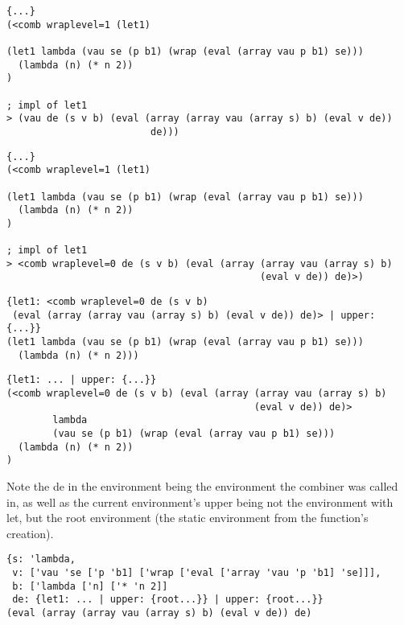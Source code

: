 \documentclass{beamer}
\begin{document}
\begin{frame}[fragile]
\footnotesize
\begin{verbatim}
{...}
(<comb wraplevel=1 (let1)

(let1 lambda (vau se (p b1) (wrap (eval (array vau p b1) se)))
  (lambda (n) (* n 2))
)

; impl of let1
> (vau de (s v b) (eval (array (array vau (array s) b) (eval v de))
                         de)))
\end{verbatim}
\end{frame}

\begin{frame}[fragile]
\footnotesize
\begin{verbatim}
{...}
(<comb wraplevel=1 (let1)

(let1 lambda (vau se (p b1) (wrap (eval (array vau p b1) se)))
  (lambda (n) (* n 2))
)

; impl of let1
> <comb wraplevel=0 de (s v b) (eval (array (array vau (array s) b)
                                            (eval v de)) de)>)
\end{verbatim}
\end{frame}

\begin{frame}[fragile]
\footnotesize
\begin{verbatim}
{let1: <comb wraplevel=0 de (s v b)
 (eval (array (array vau (array s) b) (eval v de)) de)> | upper: {...}}
(let1 lambda (vau se (p b1) (wrap (eval (array vau p b1) se)))
  (lambda (n) (* n 2)))
\end{verbatim}
\end{frame}

\begin{frame}[fragile]
\footnotesize
\begin{verbatim}
{let1: ... | upper: {...}}
(<comb wraplevel=0 de (s v b) (eval (array (array vau (array s) b)
                                           (eval v de)) de)>
		lambda
		(vau se (p b1) (wrap (eval (array vau p b1) se)))
  (lambda (n) (* n 2))
)
\end{verbatim}
\end{frame}

\begin{frame}[fragile]
Note the de in the environment being the environment the combiner was called in,
as well as the current environment's upper being not the environment with let, but
	the root environment (the static environment from the function's creation).
\footnotesize
\begin{verbatim}
{s: 'lambda,
 v: ['vau 'se ['p 'b1] ['wrap ['eval ['array 'vau 'p 'b1] 'se]]],
 b: ['lambda ['n] ['* 'n 2]]
 de: {let1: ... | upper: {root...}} | upper: {root...}}
(eval (array (array vau (array s) b) (eval v de)) de)
\end{verbatim}
\end{frame}
\end{document}
